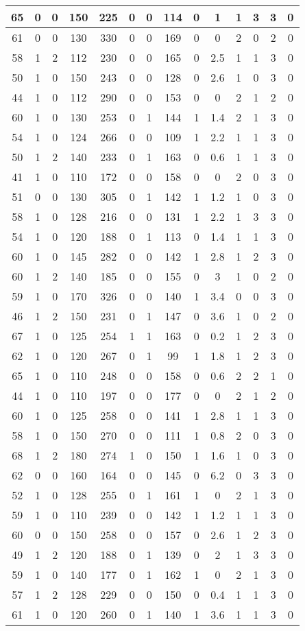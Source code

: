 \documentclass{article}
\begin{document}
\begin{tabular}{
|c|c|c|c|c|c|c|c|c|c|c|c|c|c|}
\hline
65&0&0&150&225&0&0&114&0&1&1&3&3&0 \\
\hline
61&0&0&130&330&0&0&169&0&0&2&0&2&0 \\
\hline
58&1&2&112&230&0&0&165&0&2.5&1&1&3&0 \\
\hline
50&1&0&150&243&0&0&128&0&2.6&1&0&3&0 \\
\hline
44&1&0&112&290&0&0&153&0&0&2&1&2&0 \\
\hline
60&1&0&130&253&0&1&144&1&1.4&2&1&3&0 \\
\hline
54&1&0&124&266&0&0&109&1&2.2&1&1&3&0 \\
\hline
50&1&2&140&233&0&1&163&0&0.6&1&1&3&0 \\
\hline
41&1&0&110&172&0&0&158&0&0&2&0&3&0 \\
\hline
51&0&0&130&305&0&1&142&1&1.2&1&0&3&0 \\
\hline
58&1&0&128&216&0&0&131&1&2.2&1&3&3&0 \\
\hline
54&1&0&120&188&0&1&113&0&1.4&1&1&3&0 \\
\hline
60&1&0&145&282&0&0&142&1&2.8&1&2&3&0 \\
\hline
60&1&2&140&185&0&0&155&0&3&1&0&2&0 \\
\hline
59&1&0&170&326&0&0&140&1&3.4&0&0&3&0 \\
\hline
46&1&2&150&231&0&1&147&0&3.6&1&0&2&0 \\
\hline
67&1&0&125&254&1&1&163&0&0.2&1&2&3&0 \\
\hline
62&1&0&120&267&0&1&99&1&1.8&1&2&3&0 \\
\hline
65&1&0&110&248&0&0&158&0&0.6&2&2&1&0 \\
\hline
44&1&0&110&197&0&0&177&0&0&2&1&2&0 \\
\hline
60&1&0&125&258&0&0&141&1&2.8&1&1&3&0 \\
\hline
58&1&0&150&270&0&0&111&1&0.8&2&0&3&0 \\
\hline
68&1&2&180&274&1&0&150&1&1.6&1&0&3&0 \\
\hline
62&0&0&160&164&0&0&145&0&6.2&0&3&3&0 \\
\hline
52&1&0&128&255&0&1&161&1&0&2&1&3&0 \\
\hline
59&1&0&110&239&0&0&142&1&1.2&1&1&3&0 \\
\hline
60&0&0&150&258&0&0&157&0&2.6&1&2&3&0 \\
\hline
49&1&2&120&188&0&1&139&0&2&1&3&3&0 \\
\hline
59&1&0&140&177&0&1&162&1&0&2&1&3&0 \\
\hline
57&1&2&128&229&0&0&150&0&0.4&1&1&3&0 \\
\hline
61&1&0&120&260&0&1&140&1&3.6&1&1&3&0 \\

\end{tabular}
\end{document}
